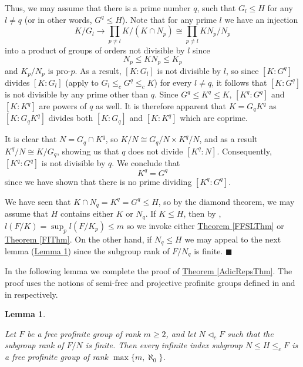 \documentclass[12pt,a4paper]{article}
\newtheorem{lemma}[theorem]{Lemma}
\newenvironment{proof}[1][Proof]{\begin{trivlist}
\item[\hskip \labelsep {\bfseries #1}]}{\end{trivlist}}
\newcommand{\lemref}[1]{\hyperref[#1]{Lemma \ref*{#1}}}
\newcommand{\thmref}[1]{\hyperref[#1]{Theorem \ref*{#1}}}
\begin{document}
\begin{proof}
Thus, we may assume that there is a prime number $q$, such that $G_l \leq H$ for any $l \neq q$ (or in other words, $G^q \leq H$). Note that for any prime $l$ we have an injection $$ K/G_l \rightarrow \prod_{p \neq l} K/(K \cap N_p) \cong \prod_{p \neq l} KN_p/N_p $$ into a product of groups of orders not divisible by $l$ since $$N_p \leq KN_p \leq K_p$$ and $K_p/N_p$ is pro-$p$. As a result, $[K : G_l]$ is not divisible by $l$, so since $[K: G^q]$ divides $[K : G_l]$ (apply \cite[Proposition 2.3.2 (d)]{RZ} to $G_l \leq_c G^q \leq_c K$) for every $l \neq q$, it follows that $[K : G^q]$ is not divisible by any prime other than $q$. Since $G^q \leq K^q \leq K$, $[K^q : G^q]$ and $[K : K^q]$ are powers of $q$ as well. It is therefore apparent that $K = G_qK^q$ as $[K : G_qK^q]$ divides both $[K : G_q]$ and $[K : K^q]$ which are coprime.

It is clear that $N = G_q \cap K^q$, so $K/N \cong G_q/N \times K^q/N$, and as a result $K^q/N \cong K/G_q$, showing us that $q$ does not divide $[K^q : N]$. Consequently, $[K^q : G^q]$ is not divisible by $q$. We conclude that $$K^q = G^q$$ since we have shown that there is no prime dividing $[K^q : G^q]$.   

We have seen that $K \cap N_q = K^q = G^q \leq H$, so by the diamond theorem, we may assume that $H$ contains either $K$ or $N_q$. If $K \leq H$, then by \cite[Proposition 2.8]{BFW}, $l(F/K) = \sup_{p}l(F/K_p) \leq m$ so we invoke either \thmref{FFSLThm} or \thmref{FIThm}. On the other hand, if $N_q \leq H$ we may appeal to the next lemma (\lemref{FinSubRankLem}) since the subgroup rank of $F/N_q$ is finite. $\blacksquare$

\end{proof}

In the following lemma we complete the proof of \thmref{AdicRepsThm}. The proof uses the notions of semi-free and projective profinite groups defined in \cite{BHH} and in \cite[Section 7.6]{RZ} respectively.

\begin{lemma} \label{FinSubRankLem}

Let $F$ be a free profinite group of rank $m \geq 2$, and let $N \lhd_c F$ such that the subgroup rank of $F/N$ is finite. Then every infinite index subgroup $N \leq H \leq_c F$ is a free profinite group of rank $\max\{m,\aleph_0\}$.

\end{lemma}
\end{document}
